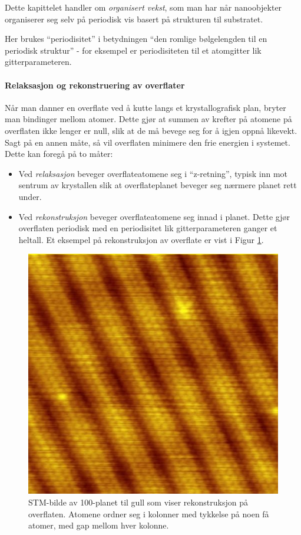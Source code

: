 Dette kapittelet handler om \emph{organisert vekst}, som man har når nanoobjekter organiserer seg selv på periodisk vis basert på strukturen til substratet.

Her brukes ``periodisitet'' i betydningen ``den romlige bølgelengden til en periodisk struktur'' - for eksempel er periodisiteten til et atomgitter lik gitterparameteren.

\paragraph{Relaksasjon og rekonstruering av overflater} Når man danner en overflate ved å kutte langs et krystallografisk plan, bryter man bindinger mellom atomer. Dette gjør at summen av krefter på atomene på overflaten ikke lenger er null, slik at de må bevege seg for å igjen oppnå likevekt. Sagt på en annen måte, så vil overflaten minimere den frie energien i systemet. Dette kan foregå på to måter:
\begin{itemize}
	\item Ved \emph{relaksasjon} beveger overflateatomene seg i ``z-retning'', typisk inn mot sentrum av krystallen slik at overflateplanet beveger seg nærmere planet rett under.
	\item Ved \emph{rekonstruksjon} beveger overflateatomene seg innad i planet. Dette gjør overflaten periodisk med en periodisitet lik gitterparameteren ganger et heltall. Et eksempel på rekonstruksjon av overflate er vist i Figur \ref{fig:recAu}. 
\end{itemize}

\begin{figure}[H]
	\bmd\centering
	\includegraphics[width=0.6\linewidth]{Atomic_resolution_Au100.JPG}
	\caption{STM-bilde av 100-planet til gull som viser rekonstruksjon på overflaten. Atomene ordner seg i kolonner med tykkelse på noen få atomer, med gap mellom hver kolonne.}
	\label{fig:recAu}
\emd\end{figure}

